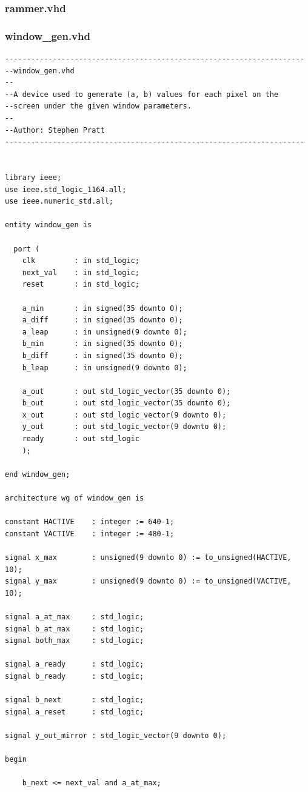 \documentclass{article}
\begin{document}
\subsubsection{rammer.vhd}							%


\subsubsection{window\_gen.vhd}					%

\begin{lstlisting}
---------------------------------------------------------------------
--window_gen.vhd
--
--A device used to generate (a, b) values for each pixel on the
--screen under the given window parameters.
--
--Author: Stephen Pratt
---------------------------------------------------------------------


library ieee;
use ieee.std_logic_1164.all;
use ieee.numeric_std.all;

entity window_gen is
  
  port (
    clk        	: in std_logic;
	next_val	: in std_logic;
	reset		: in std_logic;
    
	a_min		: in signed(35 downto 0);
	a_diff		: in signed(35 downto 0);
	a_leap		: in unsigned(9 downto 0);
	b_min		: in signed(35 downto 0);
	b_diff		: in signed(35 downto 0);
	b_leap		: in unsigned(9 downto 0);
	
	a_out		: out std_logic_vector(35 downto 0);
	b_out		: out std_logic_vector(35 downto 0);
	x_out		: out std_logic_vector(9 downto 0);
	y_out		: out std_logic_vector(9 downto 0);
	ready		: out std_logic
	);
  
end window_gen;

architecture wg of window_gen is 

constant HACTIVE	: integer := 640-1;
constant VACTIVE	: integer := 480-1;

signal x_max 		: unsigned(9 downto 0) := to_unsigned(HACTIVE, 10);
signal y_max 		: unsigned(9 downto 0) := to_unsigned(VACTIVE, 10);

signal a_at_max		: std_logic;
signal b_at_max		: std_logic;
signal both_max		: std_logic;

signal a_ready		: std_logic;
signal b_ready		: std_logic;

signal b_next		: std_logic;
signal a_reset		: std_logic;

signal y_out_mirror	: std_logic_vector(9 downto 0);

begin

	b_next <= next_val and a_at_max;
	

\end{lstlisting}
\end{document}
